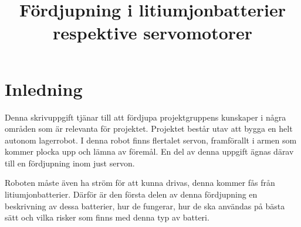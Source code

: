 \documentclass[a4paper,12pt]{article}
\title{Fördjupning i litiumjonbatterier respektive servomotorer}
\renewcommand{\thepage}{\roman{page}}
\begin{document}
\LIPStitelsida

\begin{LIPSprojektidentitet}
\end{LIPSprojektidentitet}


\renewcommand*\contentsname{Innehåll}
\begin{spacing}{0.5}
\tableofcontents{}

\end{spacing}
\newpage

\begin{LIPSdokumenthistorik}
\end{LIPSdokumenthistorik}
\newpage

\renewcommand{\thepage}{\arabic{page}}
\setcounter{page}{1}

\section{Inledning}
Denna skrivuppgift tjänar till att fördjupa projektgruppens kunskaper i några områden som är relevanta för projektet. Projektet består utav att bygga en helt autonom lagerrobot. I denna robot finns flertalet servon, framförallt i armen som kommer plocka upp och lämna av föremål. En del av denna uppgift ägnas därav till en fördjupning inom just servon.

Roboten måste även ha ström för att kunna drivas, denna kommer fås från litiumjonbatterier. Därför är den första delen av denna fördjupning en beskrivning av dessa batterier, hur de fungerar, hur de ska användas på bästa sätt och vilka risker som finns med denna typ av batteri.
\end{document}
